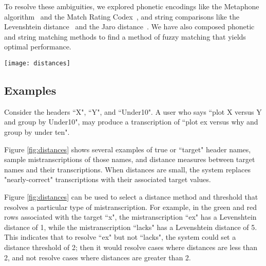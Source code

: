 \documentclass[11pt]{article}
\begin{document}
To resolve these ambiguities, we explored phonetic encodings like the Metaphone algorithm~\cite{Phillips:90} and the Match Rating Codex~\cite{Moore:77}, and string comparisons like the Levenshtein distance~\cite{Levenshtein:66} and the Jaro distance~\cite{Jaro:89}. We have also composed phonetic and string matching methods to find a method of fuzzy matching that yields optimal performance.

\begin{figure*}
\texttt{[image: distances]}
\caption{Column names fall into many categories that pose challenges to entity disambiguation. Single-letter column names, one-word homophones, and two-word concatenations are some examples. For single-letter and one-word target names, green rows are examples of mistranscriptions that we believe a system should resolve, and red rows are cases we believe the system should not resolve. For all target types, the following distances are reported: Levenshtein on words, Levenshtein on the Metaphone encodings of words, Levenshtein on the Match Rating Codex of the words, and similarly for the Jaro distance.}
\label{fig:distances}
\end{figure*}

\subsection{Examples}
Consider the headers ``X", ``Y", and ``Under10". A user who says ``plot X versus Y and group by Under10", may produce a transcription of ``plot ex versus why and group by under ten". 

Figure \ref{fig:distances} shows several examples of true or ``target" header names, sample mistranscriptions of those names, and distance measures between target names and their transcriptions. When distances are small, the system replaces "nearly-correct" transcriptions with their associated target values.

Figure \ref{fig:distances} can be used to select a distance method and threshold that resolves a particular type of mistranscription. For example, in the green and red rows associated with the target ``x", the mistranscription ``ex" has a Levenshtein distance of 1, while the mistranscription ``lacks" has a Levenshtein distance of 5. This indicates that to resolve ``ex" but not ``lacks", the system could set a distance threshold of 2; then it would resolve cases where distances are less than 2, and not resolve cases where distances are greater than 2.
\end{document}
